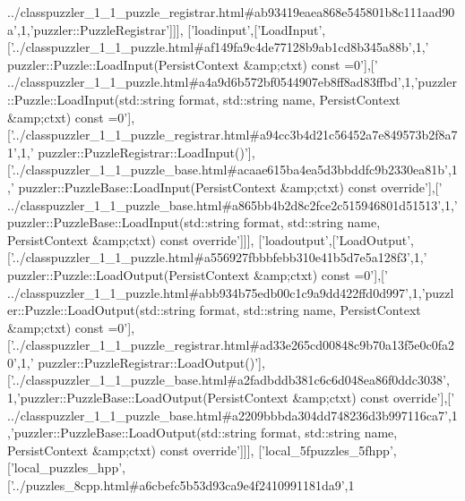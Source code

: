 \begin{DoxyCode}
{      ../classpuzzler\_1\_1\_puzzle\_registrar.html#ab93419eaea868e545801b8c111aad90a'},1,\textcolor{stringliteral}{'puzzler::PuzzleRegistrar'}]]],
  [\textcolor{stringliteral}{'loadinput'},[\textcolor{stringliteral}{'LoadInput'},[\textcolor{stringliteral}{'../classpuzzler\_1\_1\_puzzle.html#af149fa9c4de77128b9ab1cd8b345a88b'},1,\textcolor{stringliteral}{'
      puzzler::Puzzle::LoadInput(PersistContext &amp;ctxt) const =0'}],[\textcolor{stringliteral}{'
      ../classpuzzler\_1\_1\_puzzle.html#a4a9d6b572bf0544907eb8ff8ad83ffbd'},1,\textcolor{stringliteral}{'puzzler::Puzzle::LoadInput(std::string format, std::string name, PersistContext
       &amp;ctxt) const =0'}],[\textcolor{stringliteral}{'../classpuzzler\_1\_1\_puzzle\_registrar.html#a94cc3b4d21c56452a7e849573b2f8a71'},1,\textcolor{stringliteral}{'
      puzzler::PuzzleRegistrar::LoadInput()'}],[\textcolor{stringliteral}{'../classpuzzler\_1\_1\_puzzle\_base.html#acaae615ba4ea5d3bbddfc9b2330ea81b'},1,\textcolor{stringliteral}{'
      puzzler::PuzzleBase::LoadInput(PersistContext &amp;ctxt) const override'}],[\textcolor{stringliteral}{'
      ../classpuzzler\_1\_1\_puzzle\_base.html#a865bb4b2d8c2fce2c515946801d51513'},1,\textcolor{stringliteral}{'puzzler::PuzzleBase::LoadInput(std::string format, std::string
       name, PersistContext &amp;ctxt) const override'}]]],
  [\textcolor{stringliteral}{'loadoutput'},[\textcolor{stringliteral}{'LoadOutput'},[\textcolor{stringliteral}{'../classpuzzler\_1\_1\_puzzle.html#a556927fbbbfebb310e41b5d7e5a128f3'},1,\textcolor{stringliteral}{'
      puzzler::Puzzle::LoadOutput(PersistContext &amp;ctxt) const =0'}],[\textcolor{stringliteral}{'
      ../classpuzzler\_1\_1\_puzzle.html#abb934b75edb00c1c9a9dd422ffd0d997'},1,\textcolor{stringliteral}{'puzzler::Puzzle::LoadOutput(std::string format, std::string name, PersistContext
       &amp;ctxt) const =0'}],[\textcolor{stringliteral}{'../classpuzzler\_1\_1\_puzzle\_registrar.html#ad33e265cd00848c9b70a13f5e0c0fa20'},1,\textcolor{stringliteral}{'
      puzzler::PuzzleRegistrar::LoadOutput()'}],[\textcolor{stringliteral}{'../classpuzzler\_1\_1\_puzzle\_base.html#a2fadbddb381c6c6d048ea86f0ddc3038'},
      1,\textcolor{stringliteral}{'puzzler::PuzzleBase::LoadOutput(PersistContext &amp;ctxt) const override'}],[\textcolor{stringliteral}{'
      ../classpuzzler\_1\_1\_puzzle\_base.html#a2209bbbda304dd748236d3b997116ca7'},1,\textcolor{stringliteral}{'puzzler::PuzzleBase::LoadOutput(std::string format,
       std::string name, PersistContext &amp;ctxt) const override'}]]],
  [\textcolor{stringliteral}{'local\_5fpuzzles\_5fhpp'},[\textcolor{stringliteral}{'local\_puzzles\_hpp'},[\textcolor{stringliteral}{'../puzzles\_8cpp.html#a6cbefc5b53d93ca9e4f2410991181da9'},1

\end{DoxyCode}
